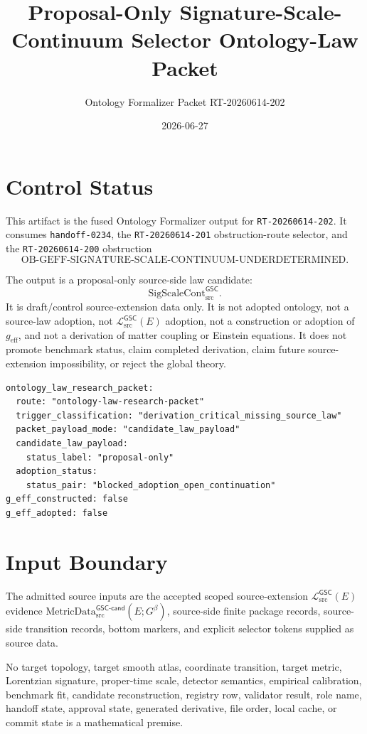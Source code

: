 \documentclass[11pt]{article}
\title{Proposal-Only Signature-Scale-Continuum Selector Ontology-Law Packet}
\author{Ontology Formalizer Packet RT-20260614-202}
\date{2026-06-27}
\newcommand{\MetricDataCand}{\mathrm{MetricData}_{\mathrm{src}}^{\mathsf{GSC\mbox{-}cand}}}
\newcommand{\MetricData}{\mathcal{L}_{\mathrm{src}}^{\mathsf{GSC}}}
\newcommand{\Gbeta}{G^{\beta}}
\newcommand{\geff}{g_{\mathrm{eff}}}
\newcommand{\SigScaleCont}{\mathrm{SigScaleCont}_{\mathrm{src}}^{\mathsf{GSC}}}
\newcommand{\ObGeff}{\mathrm{OB\mbox{-}GEFF\mbox{-}SIGNATURE\mbox{-}SCALE\mbox{-}CONTINUUM\mbox{-}UNDERDETERMINED}}
\begin{document}
\maketitle

\section{Control Status}

This artifact is the fused Ontology Formalizer output for
\texttt{RT-20260614-202}. It consumes \texttt{handoff-0234}, the
\texttt{RT-20260614-201} obstruction-route selector, and the
\texttt{RT-20260614-200} obstruction
\[
  \ObGeff .
\]

The output is a proposal-only source-side law candidate:
\[
  \SigScaleCont .
\]
It is draft/control source-extension data only. It is not adopted ontology, not
a source-law adoption, not \(\MetricData(E)\) adoption, not a construction or
adoption of \(\geff\), and not a derivation of matter coupling or Einstein
equations. It does not promote benchmark status, claim completed derivation,
claim future source-extension impossibility, or reject the global theory.

\begin{verbatim}
ontology_law_research_packet:
  route: "ontology-law-research-packet"
  trigger_classification: "derivation_critical_missing_source_law"
  packet_payload_mode: "candidate_law_payload"
  candidate_law_payload:
    status_label: "proposal-only"
  adoption_status:
    status_pair: "blocked_adoption_open_continuation"
g_eff_constructed: false
g_eff_adopted: false
\end{verbatim}

\section{Input Boundary}

The admitted source inputs are the accepted scoped source-extension
\(\MetricData(E)\) evidence \(\MetricDataCand(E;\Gbeta)\), source-side finite
package records, source-side transition records, bottom markers, and explicit
selector tokens supplied as source data.

No target topology, target smooth atlas, coordinate transition, target metric,
Lorentzian signature, proper-time scale, detector semantics, empirical
calibration, benchmark fit, candidate reconstruction, registry row, validator
result, role name, handoff state, approval state, generated derivative, file
order, local cache, or commit state is a mathematical premise.
\end{document}

